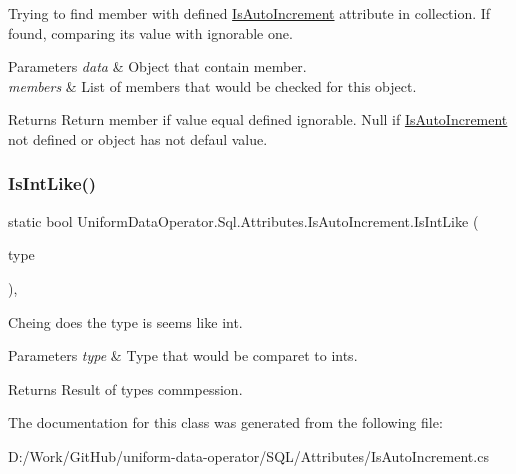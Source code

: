 Trying to find member with defined \mbox{\hyperlink{class_uniform_data_operator_1_1_sql_1_1_attributes_1_1_is_auto_increment}{Is\+Auto\+Increment}} attribute in collection. If found, comparing it\textquotesingle{}s value with ignorable one. 


\begin{DoxyParams}{Parameters}
{\em data} & Object that contain member.\\
\hline
{\em members} & List of members that would be checked for this object.\\
\hline
\end{DoxyParams}
\begin{DoxyReturn}{Returns}
Return member if value equal defined ignorable. Null if \mbox{\hyperlink{class_uniform_data_operator_1_1_sql_1_1_attributes_1_1_is_auto_increment}{Is\+Auto\+Increment}} not defined or object has not defaul value.
\end{DoxyReturn}
\mbox{\label{class_uniform_data_operator_1_1_sql_1_1_attributes_1_1_is_auto_increment_acea9a992c39c789aa6ac336d7240a7bc}} 
\subsubsection{\texorpdfstring{Is\+Int\+Like()}{IsIntLike()}}
{\footnotesize\ttfamily static bool Uniform\+Data\+Operator.\+Sql.\+Attributes.\+Is\+Auto\+Increment.\+Is\+Int\+Like (\begin{DoxyParamCaption}\item[{Type}]{type }\end{DoxyParamCaption})\hspace{0.3cm}{\ttfamily [static]}, {\ttfamily [protected]}}



Cheing does the type is seems like int. 


\begin{DoxyParams}{Parameters}
{\em type} & Type that would be comparet to ints.\\
\hline
\end{DoxyParams}
\begin{DoxyReturn}{Returns}
Result of types commpession.
\end{DoxyReturn}


The documentation for this class was generated from the following file\+:\begin{DoxyCompactItemize}
\item 
D\+:/\+Work/\+Git\+Hub/uniform-\/data-\/operator/\+S\+Q\+L/\+Attributes/Is\+Auto\+Increment.\+cs\end{DoxyCompactItemize}
